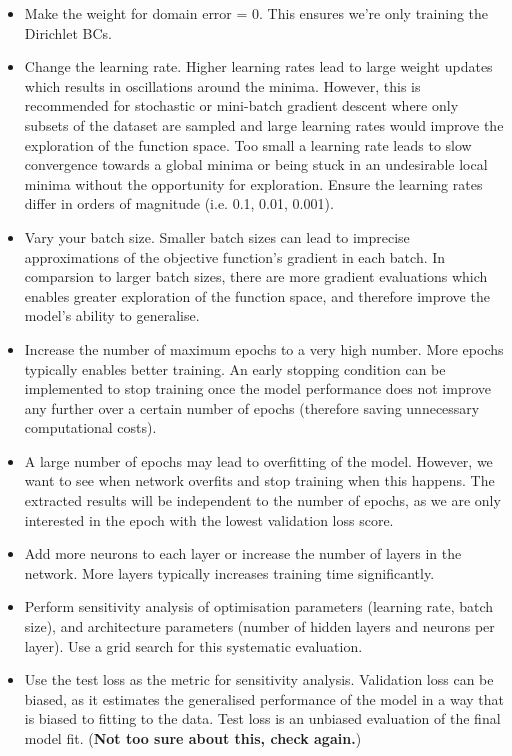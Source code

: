 \documentclass[11pt]{article}
\begin{document}
\begin{itemize}
    \item Make the weight for domain error = 0. This ensures we're only training the Dirichlet BCs. 
    \item Change the learning rate. Higher learning rates lead to large weight updates which results in oscillations around the minima. However, this is recommended for stochastic or mini-batch gradient descent where only subsets of the dataset are sampled and large learning rates would improve the exploration of the function space. Too small a learning rate leads to slow convergence towards a global minima or being stuck in an undesirable local minima without the opportunity for exploration. Ensure the learning rates differ in orders of magnitude (i.e. 0.1, 0.01, 0.001).
    \item Vary your batch size. Smaller batch sizes can lead to imprecise approximations of the objective function's gradient in each batch. In comparsion to larger batch sizes, there are more gradient evaluations which enables greater exploration of the function space, and therefore improve the model's ability to generalise.
    \item Increase the number of maximum epochs to a very high number. More epochs typically enables better training. An early stopping condition can be implemented to stop training once the model performance does not improve any further over a certain number of epochs (therefore saving unnecessary computational costs). 
    \item A large number of epochs may lead to overfitting of the model. However, we want to see when network overfits and stop training when this happens. The extracted results will be independent to the number of epochs, as we are only interested in the epoch with the lowest validation loss score. 
    \item Add more neurons to each layer or increase the number of layers in the network. More layers typically increases training time significantly.  
    \item Perform sensitivity analysis of optimisation parameters (learning rate, batch size), and architecture parameters (number of hidden layers and neurons per layer). Use a grid search for this systematic evaluation.
    \item Use the test loss as the metric for sensitivity analysis. Validation loss can be biased, as it estimates the generalised performance of the model in a way that is biased to fitting to the data. Test loss is an unbiased evaluation of the final model fit. (\textbf{Not too sure about this, check again.})\\   
\end{itemize}
\end{document}
